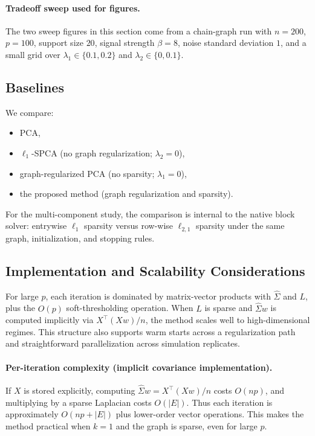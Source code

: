 \documentclass[10pt,twocolumn,letterpaper]{article}
\theoremstyle{definition}
\newcommand{\Sigmahat}{\widehat{\Sigma}}
\begin{document}
\paragraph{Tradeoff sweep used for figures.}
The two sweep figures in this section come from a chain-graph run with $n=200$, $p=100$, support size $20$, signal strength $\beta=8$, noise standard deviation $1$, and a small grid over $\lambda_1\in\{0.1,0.2\}$ and $\lambda_2\in\{0,0.1\}$.

\subsection{Baselines}
We compare:
\begin{itemize}[leftmargin=*]
\item PCA,
\item $\ell_1$-SPCA (no graph regularization; $\lambda_2=0$),
\item graph-regularized PCA (no sparsity; $\lambda_1=0$),
\item the proposed method (graph regularization and sparsity).
\end{itemize}
For the multi-component study, the comparison is internal to the native block solver: entrywise $\ell_1$ sparsity versus row-wise $\ell_{2,1}$ sparsity under the same graph, initialization, and stopping rules.

\subsection{Implementation and Scalability Considerations}
For large $p$, each iteration is dominated by matrix-vector products with $\Sigmahat$ and $L$, plus the $O(p)$ soft-thresholding operation. When $L$ is sparse and $\Sigmahat w$ is computed implicitly via $X^\top(Xw)/n$, the method scales well to high-dimensional regimes. This structure also supports warm starts across a regularization path and straightforward parallelization across simulation replicates.

\paragraph{Per-iteration complexity (implicit covariance implementation).}
If $X$ is stored explicitly, computing $\Sigmahat w = X^\top(Xw)/n$ costs $O(np)$, and multiplying by a sparse Laplacian costs $O(|E|)$. Thus each iteration is approximately $O(np + |E|)$ plus lower-order vector operations. This makes the method practical when $k=1$ and the graph is sparse, even for large $p$.
\end{document}
